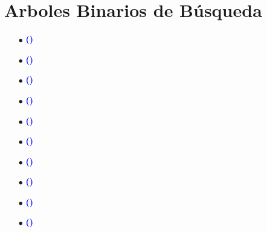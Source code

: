 \documentclass[12pt]{article}
\begin{document}
\section{Arboles Binarios de Búsqueda}
{
    
    \begin{enumerate}
        \item[$\bullet$]\textbf{\textcolor{blue}{()}  }{}
        
        \item[$\bullet$]\textbf{\textcolor{blue}{()}  }{}
        
        \item[$\bullet$]\textbf{\textcolor{blue}{()}  }{}
        
        \item[$\bullet$]\textbf{\textcolor{blue}{()}  }{}
        
        \item[$\bullet$]\textbf{\textcolor{blue}{()}  }{}
        
        \item[$\bullet$]\textbf{\textcolor{blue}{()}  }{}
        
        \item[$\bullet$]\textbf{\textcolor{blue}{()}  }{}
        
        \item[$\bullet$]\textbf{\textcolor{blue}{()}  }{}
        
        \item[$\bullet$]\textbf{\textcolor{blue}{()}  }{}
        
        \item[$\bullet$]\textbf{\textcolor{blue}{()}  }{}
    \end{enumerate}
    
}
\end{document}
